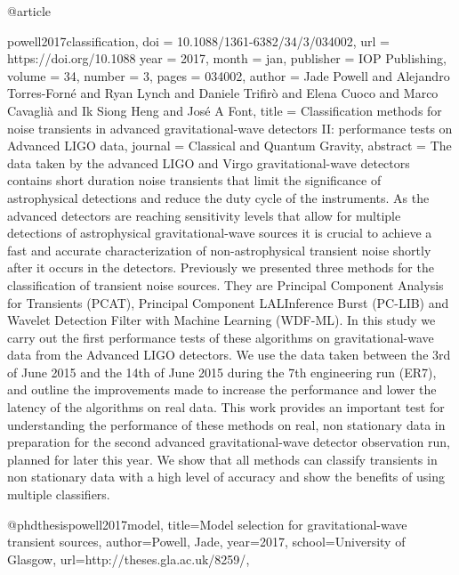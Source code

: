 {{{{@article{powell2017classification,
	doi = {10.1088/1361-6382/34/3/034002},
	url = {https://doi.org/10.1088%
	year = 2017,
	month = {jan},
	publisher = {{IOP} Publishing},
	volume = {34},
	number = {3},
	pages = {034002},
	author = {Jade Powell and Alejandro Torres-Forn{\'{e}} and Ryan Lynch and Daniele Trifir{\`{o}} and Elena Cuoco and Marco Cavagli{\`{a}} and Ik Siong Heng and Jos{\'{e}} A Font},
	title = {Classification methods for noise transients in advanced gravitational-wave detectors {II}: performance tests on Advanced {LIGO} data},
	journal = {Classical and Quantum Gravity},
	abstract = {The data taken by the advanced LIGO and Virgo gravitational-wave detectors contains short duration noise transients that limit the significance of astrophysical detections and reduce the duty cycle of the instruments. As the advanced detectors are reaching sensitivity levels that allow for multiple detections of astrophysical gravitational-wave sources it is crucial to achieve a fast and accurate characterization of non-astrophysical transient noise shortly after it occurs in the detectors. Previously we presented three methods for the classification of transient noise sources. They are Principal Component Analysis for Transients (PCAT), Principal Component LALInference Burst (PC-LIB) and Wavelet Detection Filter with Machine Learning (WDF-ML). In this study we carry out the first performance tests of these algorithms on gravitational-wave data from the Advanced LIGO detectors. We use the data taken between the 3rd of June 2015 and the 14th of June 2015 during the 7th engineering run (ER7), and outline the improvements made to increase the performance and lower the latency of the algorithms on real data. This work provides an important test for understanding the performance of these methods on real, non stationary data in preparation for the second advanced gravitational-wave detector observation run, planned for later this year. We show that all methods can classify transients in non stationary data with a high level of accuracy and show the benefits of using multiple classifiers.}
}


@phdthesis{powell2017model,
  title={Model selection for gravitational-wave transient sources},
  author={Powell, Jade},
  year={2017},
  school={University of Glasgow},
  url={http://theses.gla.ac.uk/8259/},
}


}}}}}
